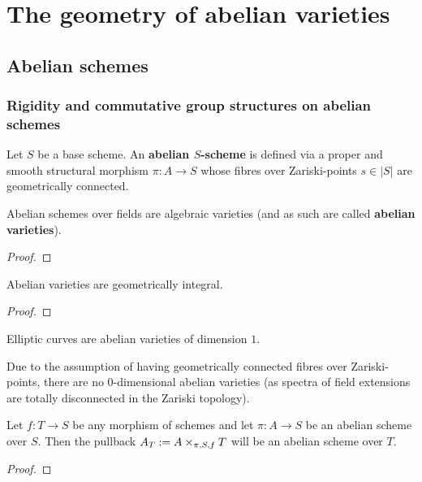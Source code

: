 \section{The geometry of abelian varieties}
    \subsection{Abelian schemes}
        \subsubsection{Rigidity and commutative group structures on abelian schemes}
            \begin{definition} \label{def: abelian_schemes}
                Let $S$ be a base scheme. An \textbf{abelian $S$-scheme} is defined via a proper and smooth structural morphism $\pi: A \to S$ whose fibres over Zariski-points $s \in |S|$ are geometrically connected. 
            \end{definition}
            \begin{proposition} \label{prop: abelian_schemes_over_fields_are_varieties}
                Abelian schemes over fields are algebraic varieties (and as such are called \textbf{abelian varieties}).
            \end{proposition}
                \begin{proof}
                        
                \end{proof}
            \begin{corollary} \label{coro: abelian_varieties_are_geometrically_integral}
                Abelian varieties are geometrically integral.
            \end{corollary}
                \begin{proof}
                    
                \end{proof}
            \begin{example}
                Elliptic curves are abelian varieties of dimension $1$.
            \end{example}
            \begin{example}
                Due to the assumption of having geometrically connected fibres over Zariski-points, there are no $0$-dimensional abelian varieties (as spectra of field extensions are totally disconnected in the Zariski topology).
            \end{example}
            \begin{proposition}
                Let $f: T \to S$ be any morphism of schemes and let $\pi: A \to S$ be an abelian scheme over $S$. Then the pullback $A_T := A \x_{\pi, S, f} T$ will be an abelian scheme over $T$.
            \end{proposition}
                \begin{proof}
                    
                \end{proof}
                
